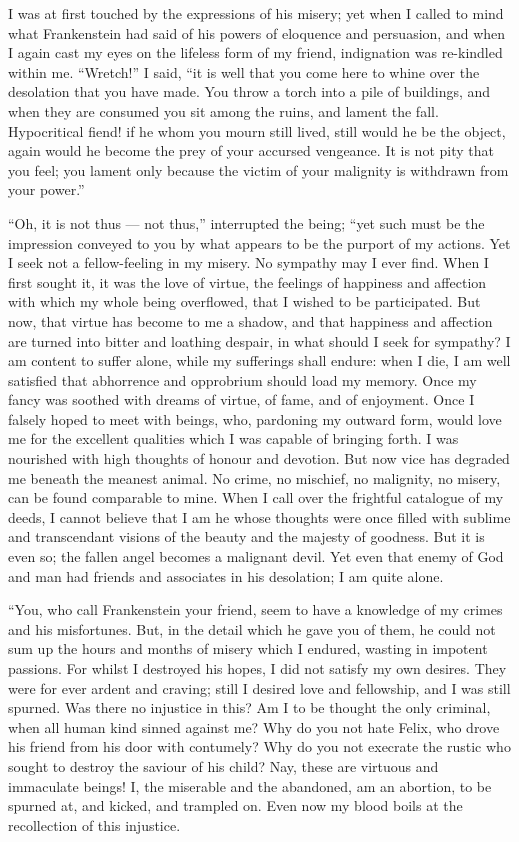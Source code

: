 I was at first touched by the
expressions of his misery; yet when I called to
mind what Frankenstein had said of
his powers of eloquence and persuasion,
and when I again cast my eyes on
the lifeless form of my friend, indignation
was re-kindled within me.
``Wretch!'' I said, ``it is well that
you come here to whine over the desolation
that you have made. You throw
a torch into a pile of buildings, and
when they are consumed you sit among
the ruins, and lament the fall. Hypocritical
fiend! if he whom you mourn
still lived, still would he be the object,
again would he become the prey of
your accursed vengeance. It is not
pity that you feel; you lament only because
the victim of your malignity is
withdrawn from your power.''

``Oh, it is not thus --- not thus,'' interrupted
the being; ``yet such must
be the impression conveyed to you by
what appears to be the purport of my
actions. Yet I seek not a fellow-feeling
in my misery. No sympathy
may I ever find. When I first sought
it, it was the love of virtue, the feelings
of happiness and affection with
which my whole being overflowed, that
I wished to be participated. But now,
that virtue has become to me a shadow,
and that happiness and affection
are turned into bitter and loathing despair,
in what should I seek for sympathy?
I am content to suffer alone,
while my sufferings shall endure: when
I die, I am well satisfied that abhorrence
and opprobrium should load my
memory. Once my fancy was soothed
with dreams of virtue, of fame, and of
enjoyment. Once I falsely hoped to
meet with beings, who, pardoning my
outward form, would love me for the
excellent qualities which I was capable
of bringing forth. I was nourished
with high thoughts of honour and devotion.
But now vice has degraded
me beneath the meanest animal. No
crime, no mischief, no malignity, no
misery, can be found comparable to
mine. When I call over the frightful
catalogue of my deeds, I cannot believe
that I am he whose thoughts were
once filled with sublime and transcendant
visions of the beauty and the majesty
of goodness. But it is even so;
the fallen angel becomes a malignant
devil. Yet even that enemy of God
and man had friends and associates in
his desolation; I am quite alone.

``You, who call Frankenstein your
friend, seem to have a knowledge of
my crimes and his misfortunes. But,
in the detail which he gave you of
them, he could not sum up the hours
and months of misery which I endured,
wasting in impotent passions. For
whilst I destroyed his hopes, I did not
satisfy my own desires. They were for
ever ardent and craving; still I desired
love and fellowship, and I was still
spurned. Was there no injustice in
this? Am I to be thought the only
criminal, when all human kind sinned
against me? Why do you not hate
Felix, who drove his friend from his
door with contumely? Why do you
not execrate the rustic who sought to
destroy the saviour of his child? Nay,
these are virtuous and immaculate beings!
I, the miserable and the abandoned,
am an abortion, to be spurned
at, and kicked, and trampled on. Even
now my blood boils at the recollection
of this injustice.

